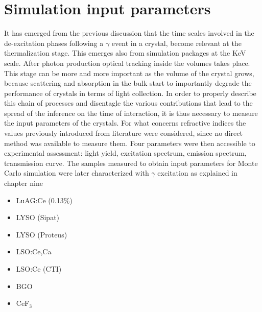 \section{Simulation input parameters}

It has emerged from the previous discussion that the time scales involved in the de-excitation phases following a $\gamma$ event in a crystal, become relevant at the thermalization stage. This emerges also from simulation packages at the KeV scale.
After photon production optical tracking inside the volumes takes place. This stage can be more and more important as the volume of the crystal grows, because scattering and absorption in the bulk start to importantly degrade the performance of crystals in terms of light collection.
In order to properly describe this chain of processes and disentagle the various contributions that lead to the spread of the inference on the time of interaction, it is thus necessary to measure the input parameters of the crystals.
For what concerns refractive indices the values previously introduced from literature were considered, since no direct method was available to measure them.
Four parameters were then accessible to experimental assessment: light yield, excitation spectrum, emission spectrum, transmission curve.
The samples measured to obtain input parameters for Monte Carlo simulation were later characterized with $\gamma$ excitation as explained in chapter nine 
\begin{itemize}
\item LuAG:Ce (0.13$\%$)
\item LYSO (Sipat)
\item LYSO (Proteus)
\item LSO:Ce,Ca 
\item LSO:Ce (CTI)
\item BGO
\item CeF$_{3}$
\end{itemize}

